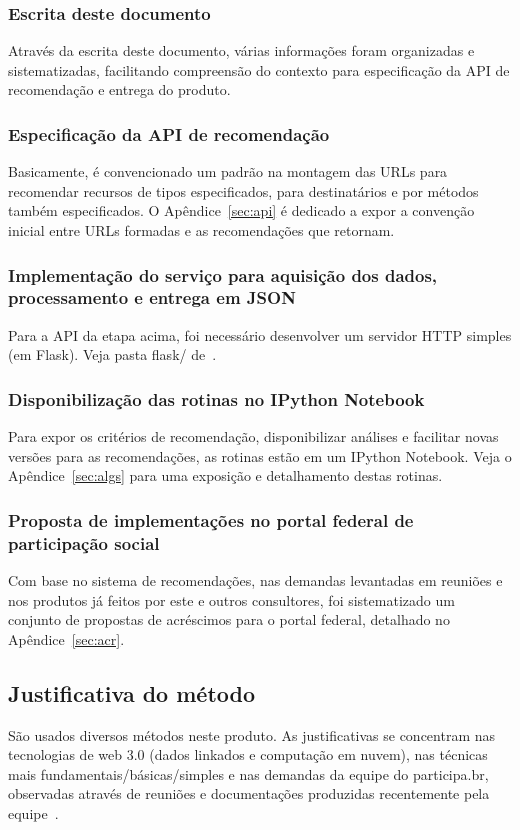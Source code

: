\documentclass[12pt]{article}
\begin{document}
\subsubsection{Escrita deste documento}
Através da escrita deste documento, várias informações foram organizadas e sistematizadas, facilitando compreensão do contexto para especificação da API de recomendação e entrega do produto.
\subsubsection{Especificação da API de recomendação}
Basicamente, é convencionado um padrão na montagem das URLs para recomendar recursos de tipos especificados, para destinatários e por métodos também especificados. O Apêndice~\ref{sec:api} é dedicado a expor a convenção inicial entre URLs formadas e as recomendações que retornam.
\subsubsection{Implementação do serviço para aquisição dos dados, processamento e entrega em JSON}
Para a API da etapa acima, foi necessário desenvolver um servidor HTTP simples (em Flask). Veja pasta flask/ de~\cite{repoProd4}. 
\subsubsection{Disponibilização das rotinas no IPython Notebook}
Para expor os critérios de recomendação, disponibilizar análises e facilitar novas versões para as recomendações, as rotinas estão em um IPython Notebook. Veja o Apêndice~\ref{sec:algs} para uma exposição e detalhamento destas rotinas.
\subsubsection{Proposta de implementações no portal federal de participação social}
Com base no sistema de recomendações, nas demandas levantadas em reuniões e nos produtos já feitos por este e outros consultores, foi sistematizado um conjunto de propostas de acréscimos para o portal federal, detalhado no Apêndice~\ref{sec:acr}.
\subsection{Justificativa do método}
São usados diversos métodos neste produto. As justificativas se concentram nas tecnologias de web 3.0 (dados linkados e computação em nuvem), nas técnicas mais fundamentais/básicas/simples e nas demandas da equipe do participa.br, observadas através de reuniões e documentações produzidas recentemente pela equipe~\cite{prodExtra}.
\end{document}
